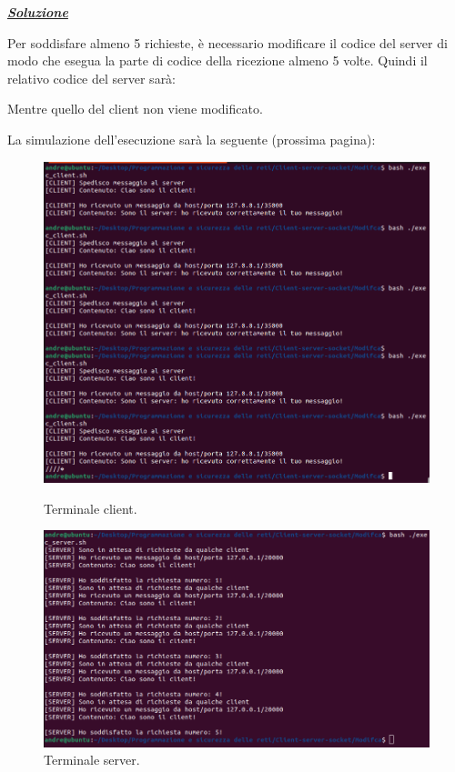 \documentclass[a4paper]{article}
\begin{document}
	\noindent
	\textcolor{Green4}{\textbf{\emph{\underline{Soluzione}}}}\newline
	
	\noindent
	Per soddisfare almeno 5 richieste, è necessario modificare il codice del server di modo che esegua la parte di codice della ricezione almeno 5 volte. Quindi il relativo codice del server sarà:
	
	Mentre quello del client non viene modificato.
	
	\noindent
	La simulazione dell'esecuzione sarà la seguente (prossima pagina):
	\begin{figure}[!htp]
		\centering
		\includegraphics[width=\textwidth]{img/soluzioni_TCP-UDP/TCP-UDP_1.png}
		\caption{Terminale client.}
		\:\newline
		\includegraphics[width=\textwidth]{img/soluzioni_TCP-UDP/TCP-UDP_2.png}
		\caption{Terminale server.}
	\end{figure}\newpage
\end{document}
